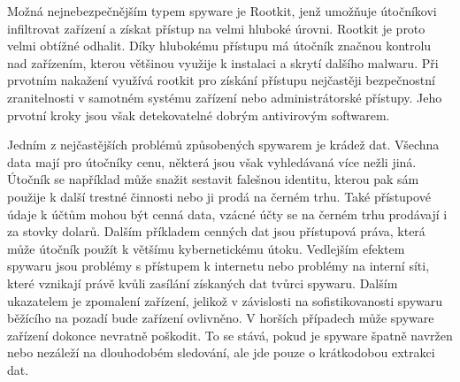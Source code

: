 Možná nejnebezpečnějším typem spyware je Rootkit, jenž umožňuje útočníkovi infiltrovat zařízení a získat přístup na velmi hluboké úrovni.
Rootkit je proto velmi obtížné odhalit.
Díky hlubokému přístupu má útočník značnou kontrolu nad zařízením, kterou většinou využije k instalaci a skrytí dalšího malwaru.
Při prvotním nakažení využívá rootkit pro získání přístupu nejčastěji bezpečnostní zranitelnosti v samotném systému zařízení nebo administrátorské přístupy.
Jeho prvotní kroky jsou však detekovatelné dobrým antivirovým softwarem.\cite{avast_spyware}

Jedním z nejčastějších problémů způsobených spywarem je krádež dat.
Všechna data mají pro útočníky cenu, některá jsou však vyhledávaná více nežli jiná.
Útočník se například může snažit sestavit falešnou identitu, kterou pak sám použije k další trestné činnosti nebo ji prodá na černém trhu.
Také přístupové údaje k účtům mohou být cenná data, vzácné účty se na černém trhu prodávají i za stovky dolarů.
Dalším příkladem cenných dat jsou přístupová práva, která může útočník použít k většímu kybernetickému útoku.
Vedlejším efektem spywaru jsou problémy s přístupem k internetu nebo problémy na interní síti, které vznikají právě kvůli zasílání získaných dat tvůrci spywaru.
Dalším ukazatelem je zpomalení zařízení, jelikož v závislosti na sofistikovanosti spywaru běžícího na pozadí bude zařízení ovlivněno.
V horších případech může spyware zařízení dokonce nevratně poškodit.
To se stává, pokud je spyware špatně navržen nebo nezáleží na dlouhodobém sledování, ale jde pouze o krátkodobou extrakci dat.\cite{avast_spyware, fortinet_spyware}

